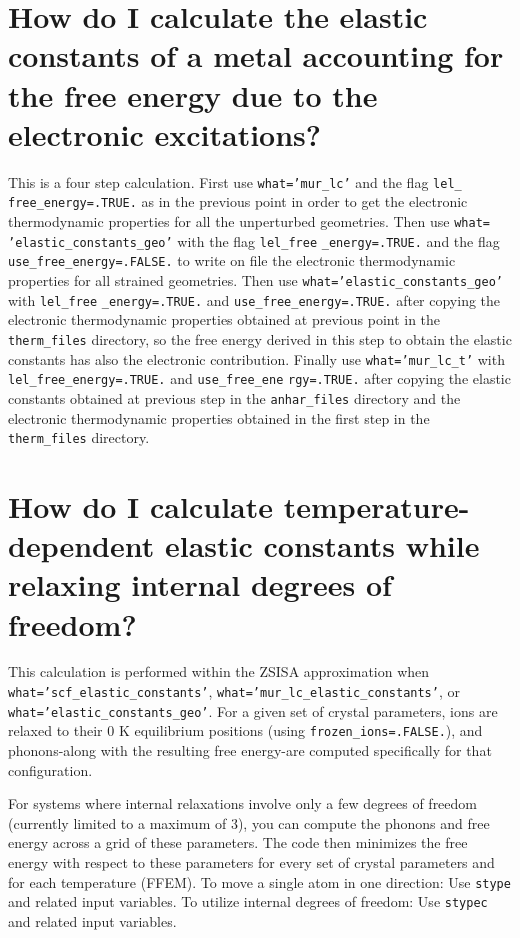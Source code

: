 \documentclass[12pt,a4paper,twoside]{report}
\begin{document}
\newpage
{\color{coral}\section{How do I calculate the elastic constants of a metal
accounting for the free energy due to the electronic excitations?}}
\color{black}
This is a four step calculation. First use \texttt{what='mur\_lc'} and
the flag \texttt{lel\_} \texttt{free\_energy=.TRUE.} as in the previous point
in order to get the electronic thermodynamic properties for all the 
unperturbed geometries. Then use \texttt{what=} \texttt{'elastic\_constants\_geo'}
with the flag \texttt{lel\_free} \texttt{\_energy=.TRUE.} and the flag
\texttt{use\_free\_energy=.FALSE.} to write on file the electronic
thermodynamic properties for all strained geometries. Then use
\texttt{what='elastic\_constants\_geo'} with \texttt{lel\_free}
\texttt{\_energy=.TRUE.}
and \texttt{use\_free\_energy=.TRUE.} after copying the electronic
thermodynamic properties obtained at previous point in the 
\texttt{therm\_files} directory, so the 
free energy derived in this step to obtain the elastic constants 
has also the electronic contribution. 
Finally use \texttt{what='mur\_lc\_t'} with \texttt{lel\_free\_energy=.TRUE.}
and \texttt{use\_free\_ene} \texttt{rgy=.TRUE.} after copying the elastic
constants obtained at previous step in the \texttt{anhar\_files} directory
and the electronic thermodynamic properties obtained in the first 
step in the \texttt{therm\_files} directory.

\newpage
{\color{coral}\section{How do I calculate temperature-dependent elastic 
constants while relaxing internal degrees of freedom?}}

This calculation is performed within the ZSISA approximation
when \texttt{what='scf\_elastic\_constants'}, 
\texttt{what='mur\_lc\_elastic\_constants'}, or
\texttt{what='elastic\_constants\_geo'}.
For a given set of crystal parameters, ions are relaxed to their 
$0$ K equilibrium positions (using \texttt{frozen\_ions=.FALSE.}), 
and phonons-along with the resulting free energy-are computed 
specifically for that configuration.

For systems where internal relaxations involve only a few degrees of 
freedom (currently limited to a maximum of $3$), you can compute the 
phonons and free energy across a grid of these parameters. The code 
then minimizes the free energy with respect to these parameters 
for every set of crystal parameters and for each temperature (FFEM).
To move a single atom in one direction: Use \texttt{stype} and related 
input variables.
To utilize internal degrees of freedom: Use \texttt{stypec} and related
input variables. 
\end{document}
